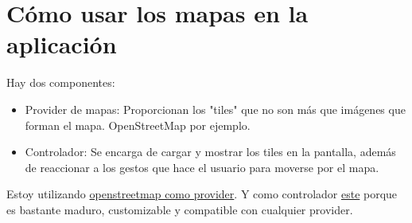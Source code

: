 \chapter{Cómo usar los mapas en la aplicación}

Hay dos componentes:
 \begin{itemize}
   \item Provider de mapas: Proporcionan los "tiles" que no son más que imágenes que forman el mapa. OpenStreetMap por ejemplo.
   \item Controlador: Se encarga de cargar y mostrar los tiles en la pantalla, además de reaccionar a los gestos que hace el usuario para moverse por el mapa. 
 \end{itemize}

 Estoy utilizando \href{https://wiki.openstreetmap.org/wiki/Tiles}{openstreetmap como provider}. Y como controlador \href{https://pub.dev/packages/map}{este} porque es bastante maduro, customizable y compatible con cualquier provider.